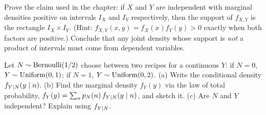 \begin{exercise}
\label{ch13:ex-proof-support}
Prove the claim used in the chapter: if $X$ and $Y$ are independent with marginal
densities positive on intervals $I_X$ and $I_Y$ respectively, then the support of
$f_{X,Y}$ is the rectangle $I_X\times I_Y$. (Hint: $f_{X,Y}(x,y)=f_X(x)f_Y(y)>0$
exactly when both factors are positive.) Conclude that any joint density whose
support is \emph{not} a product of intervals must come from dependent variables.
\end{exercise}

\begin{exercise}
\label{ch13:ex-mixed}
Let $N\sim\operatorname{Bernoulli}(1/2)$ choose between two recipes for a continuous $Y$: if $N=0$,
$Y\sim\operatorname{Uniform}(0,1)$; if $N=1$, $Y\sim\operatorname{Uniform}(0,2)$. (a) Write the conditional density
$f_{Y\mid N}(y\mid n)$. (b) Find the marginal density $f_Y(y)$ via the law of
total probability, $f_Y(y)=\sum_n p_N(n)\,f_{Y\mid N}(y\mid n)$, and sketch
it. (c) Are $N$ and $Y$ independent? Explain using $f_{Y\mid N}$.
\end{exercise}
